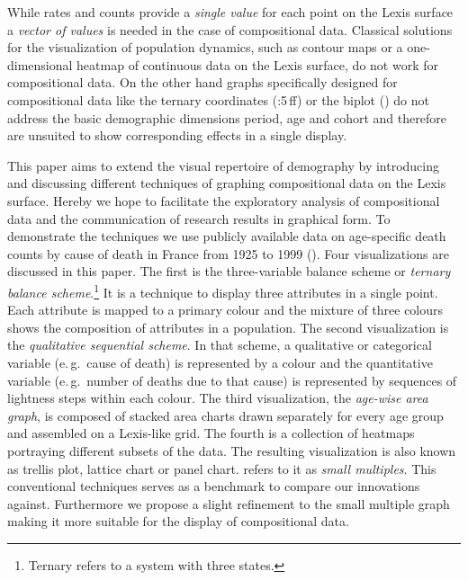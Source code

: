 \documentclass[a4paper, 12pt]{scrartcl}
\begin{document}
While rates and counts provide a \emph{single value} for each point on the Lexis surface a \emph{vector of values} is needed in the case of compositional data. Classical solutions for the visualization of population dynamics, such as contour maps or a one-dimensional heatmap of continuous data on the Lexis surface, do not work for compositional data. On the other hand graphs specifically designed for compositional data like the ternary coordinates (\cite{Aitchison1986}:5\,ff) or the biplot (\cite{Gabriel1971, Aitchison2002}) do not address the basic demographic dimensions period, age and cohort and therefore are unsuited to show corresponding effects in a single display.

This paper aims to extend the visual repertoire of demography by introducing and discussing different techniques of graphing compositional data on the Lexis surface. Hereby we hope to facilitate the exploratory analysis of compositional data and the communication of research results in graphical form. To demonstrate the techniques we use publicly available data on age-specific death counts by cause of death in France from 1925 to 1999 (\cite{Vallin2014}). Four visualizations are discussed in this paper. The first is the three-variable balance scheme or \emph{ternary balance scheme}.\footnote{Ternary refers to a system with three states.} It is a technique to display three attributes in a single point. Each attribute is mapped to a primary colour and the mixture of three colours shows the composition of attributes in a population. The second visualization is the \emph{qualitative sequential scheme}. In that scheme, a qualitative or categorical variable (e.\,g.~cause of death) is represented by a colour and the quantitative variable (e.\,g.~number of deaths due to that cause) is represented by sequences of lightness steps within each colour. The third visualization, the \emph{age-wise area graph}, is composed of stacked area charts drawn separately for every age group and assembled on a Lexis-like grid. The fourth is a collection of heatmaps portraying different subsets of the data. The resulting visualization is also known as trellis plot, lattice chart or panel chart. \textcite{Tufte1990} refers to it as \emph{small multiples}. This conventional techniques serves as a benchmark to compare our innovations against. Furthermore we propose a slight refinement to the small multiple graph making it more suitable for the display of compositional data.
\end{document}
